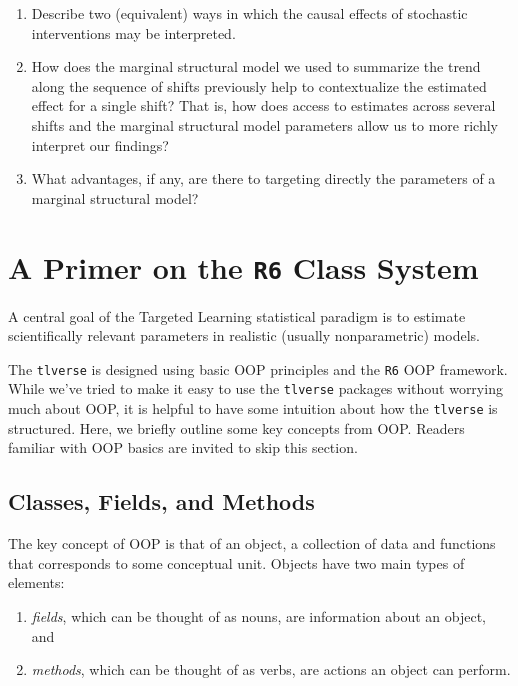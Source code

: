 \documentclass[12pt, krantz2,]{krantz}
\providecommand{\tightlist}{%
  \setlength{\itemsep}{0pt}\setlength{\parskip}{0pt}}
\theoremstyle{definition}
\theoremstyle{definition}
\theoremstyle{definition}
\newcommand{\1}{\mathbbm{1}}
\begin{document}
\begin{enumerate}
\def\labelenumi{\arabic{enumi}.}
\item
  Describe two (equivalent) ways in which the causal effects of stochastic
  interventions may be interpreted.
\item
  How does the marginal structural model we used to summarize the trend along
  the sequence of shifts previously help to contextualize the estimated effect
  for a single shift? That is, how does access to estimates across several
  shifts and the marginal structural model parameters allow us to more richly
  interpret our findings?
\item
  What advantages, if any, are there to targeting directly the parameters of a
  marginal structural model?
\end{enumerate}

\hypertarget{r6}{%
\section{\texorpdfstring{A Primer on the \texttt{R6} Class System}{A Primer on the R6 Class System}}\label{r6}}

A central goal of the Targeted Learning statistical paradigm is to estimate
scientifically relevant parameters in realistic (usually nonparametric) models.

The \texttt{tlverse} is designed using basic OOP principles and the \texttt{R6} OOP framework.
While we've tried to make it easy to use the \texttt{tlverse} packages without worrying
much about OOP, it is helpful to have some intuition about how the \texttt{tlverse} is
structured. Here, we briefly outline some key concepts from OOP. Readers
familiar with OOP basics are invited to skip this section.

\hypertarget{classes-fields-and-methods}{%
\subsection{Classes, Fields, and Methods}\label{classes-fields-and-methods}}

The key concept of OOP is that of an object, a collection of data and functions
that corresponds to some conceptual unit. Objects have two main types of
elements:

\begin{enumerate}
\def\labelenumi{\arabic{enumi}.}
\tightlist
\item
  \emph{fields}, which can be thought of as nouns, are information about an object,
  and
\item
  \emph{methods}, which can be thought of as verbs, are actions an object can
  perform.
\end{enumerate}
\end{document}
